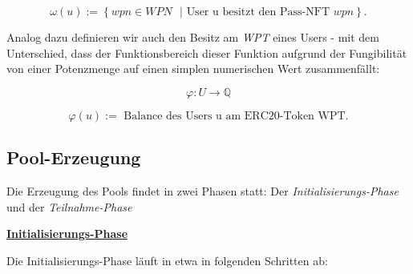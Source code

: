 \begin{Def}
\begin{equation*}
  \omega(u):= \left\{ wpn \in WPN \text{ } | \text{ User u besitzt den Pass-NFT } wpn \right\}. 
\end{equation*}

\vspace{0.2cm}

Analog dazu definieren wir auch den Besitz am \textit{WPT} eines Users - mit dem Unterschied, dass der Funktionsbereich dieser Funktion aufgrund der Fungibilität von einer Potenzmenge auf einen simplen numerischen Wert zusammenfällt:

\vspace{0.2cm}

\begin{equation*}
  \varphi : U \rightarrow \mathbb{Q}  
\end{equation*}

\begin{equation*}
  \varphi(u):= \text{ Balance des Users u am ERC20-Token WPT}. 
\end{equation*}

\end{Def}

\vspace{0.5cm}

\subsection{Pool-Erzeugung}

\vspace{0.3cm}

Die Erzeugung des Pools findet in zwei Phasen statt: Der \textit{Initialisierungs-Phase} und der \textit{Teilnahme-Phase}

\vspace{0.2cm}

\underline{\textbf{Initialisierungs-Phase}}

\vspace{0.2cm}

Die Initialisierungs-Phase läuft in etwa in folgenden Schritten ab:

